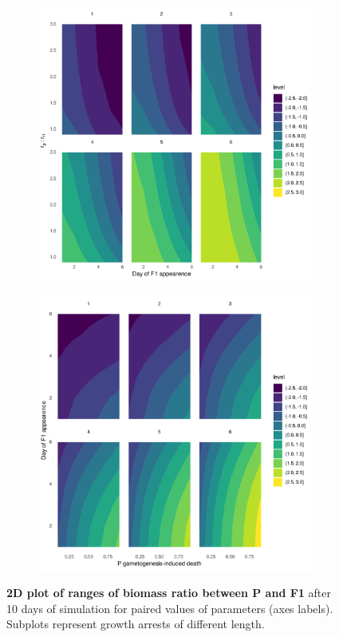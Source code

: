 \documentclass[a4paper,oneside]{book}
\begin{document}
\begin{figure}[h]
      \begin{subfigure}{0.45\textwidth}
        \includegraphics[width=\linewidth]{imgs/c.pdf}
      \end{subfigure}
      \begin{subfigure}{0.45\textwidth}
        \includegraphics[width=\linewidth]{imgs/d.pdf}
      \end{subfigure}
      \caption{\textbf{2D plot of ranges of biomass ratio between P and F1} after 10 days of simulation for paired values of parameters (axes labels). Subplots represent growth arrests of different length.}\label{gon4}
    \end{figure}
%
\pagebreak
%
\end{document}
